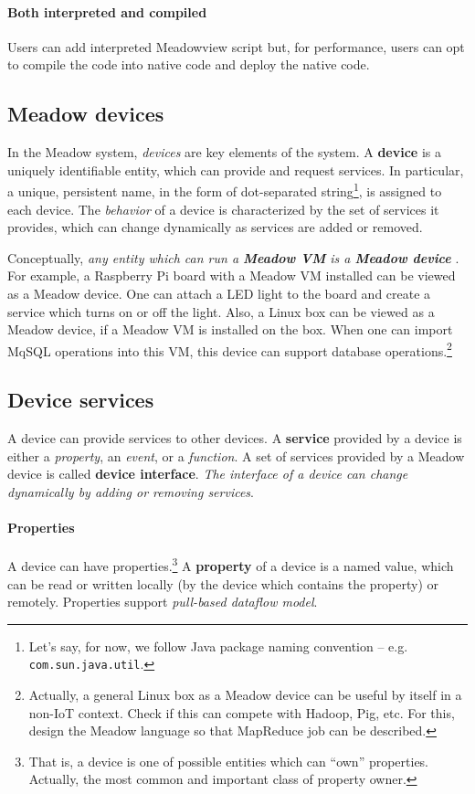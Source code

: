 \documentclass{note}
\begin{document}
\paragraph{Both interpreted and compiled}
Users can add interpreted Meadowview script
but, for performance, users can opt to compile the code into native code and 
deploy the native code.

\subsection{Meadow devices}
In the Meadow system, {\em devices\/} are key elements of the
system. A \textcolor{blue2}{\bf{}device} is a uniquely identifiable entity,
which can provide and request services. 
In particular, a unique, persistent name, in the form of dot-separated
string\footnote{Let's say, for now, we follow Java package naming convention
  -- e.g. \texttt{com.sun.java.util}.},
is assigned to each device. The {\em behavior\/} of a device is characterized
by the set of services it provides, which can change dynamically as
services are added or removed. 

Conceptually, \textcolor{blue2}{\em any entity which can run a
  \textcolor{blue2}{\bf{}\em Meadow VM} is a {\bf\em Meadow device} \/}. 
For example, a Raspberry Pi board with a Meadow VM installed can be viewed as a
Meadow device. One can attach a LED light to the board and create a service 
which turns on or off the light.
Also, a Linux box can be viewed as a Meadow
device, if a Meadow VM is installed on the box.
When one can import MqSQL operations into this VM, this device can support
database operations.\footnote{\textcolor{green2}{Actually, a general Linux box
    as a Meadow device can be useful by itself in a non-IoT context. 
    Check if this can
    compete with Hadoop, Pig, etc. For this, design the Meadow language so that
    MapReduce job can be described.}}

\subsection{Device services}
A device can provide services to other devices. 
A \textcolor{blue2}{\bf{}service} provided by a device is either a
{\em property}, an {\em event\/}, or a {\em function\/}. 
A set of services provided by a Meadow device is called
\textcolor{blue2}{\bf{}device interface}. 
\textcolor{blue2}{\em The interface of a device can change
dynamically by adding or removing services\/}.

\paragraph{Properties}
A device can have properties.\footnote{\textcolor{green2}{That is, a device is
    one of possible entities which can ``own'' properties. Actually, the most
    common and important class of property owner.}} A
  \textcolor{blue2}{\bf{}property} 
of a device is a named value, which can be read or written
locally (by the device which contains the property) or remotely.
Properties support {\em pull-based dataflow model\/}.
\end{document}
